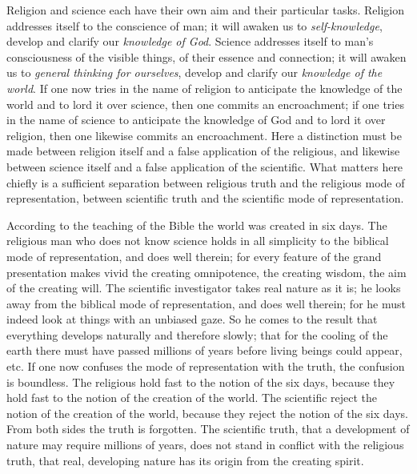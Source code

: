 \documentclass[12pt,a4paper,openany]{book}
\newcommand{\opage}[1]{\marginnote{\footnotesize\textit{[#1]}}}
\begin{document}
Religion and science each have their own aim and
their particular tasks. Religion addresses itself to
the conscience of man; it will awaken us to \emph{self-knowledge},
develop and clarify our \emph{knowledge of God}.
\setcounter{footnote}{0}%
\opage{132}Science addresses itself to man's consciousness
of the visible things, of their essence and connection;
it will awaken us to \emph{general thinking for ourselves},
develop and clarify our \emph{knowledge of the world}. If one
now tries in the name of religion to anticipate the knowledge of the world
and to lord it over science, then one commits
an encroachment; if one tries in the name of science to
anticipate the knowledge of God and to lord it over religion,
then one likewise commits an encroachment. Here a distinction must be made
between religion itself and a false application
of the religious, and likewise between science itself
and a false application of the scientific. What
matters here chiefly is a sufficient
separation between religious truth and
the religious mode of representation, between scientific
truth and the scientific mode of representation.

According to the teaching of the Bible the world was created in six days.
The religious man who does not know science holds
in all simplicity to the biblical mode of representation,
and does well therein; for every feature of the grand
presentation makes vivid the creating omnipotence,
the creating wisdom, the aim of the creating will.
The scientific investigator takes real nature
as it is; he looks away from the biblical mode of representation,
and does well therein; for he must indeed look
at things with an unbiased gaze. So he comes
to the result that everything develops naturally and therefore
slowly; that for the cooling of the earth there must
have passed millions of years before living
beings could appear, etc. If one now confuses
the mode of representation with the truth, the confusion is
boundless. The religious hold fast to the notion
\setcounter{footnote}{0}%
\opage{133}of the six days, because they hold fast to the notion
of the creation of the world. The scientific reject
the notion of the creation of the world, because they reject
the notion of the six days. From both sides
the truth is forgotten. The scientific truth, that a
development of nature may require millions of years, does not stand
in conflict with the religious truth, that real,
developing nature has its origin from the creating
spirit.
\end{document}
